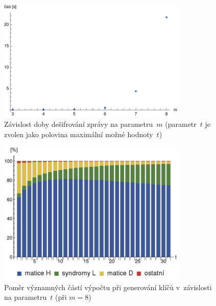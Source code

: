 \documentclass[thesis=M,czech,hidelinks]{FITthesis}[2012/06/26]
\newcommand{\0}{{\textcolor[gray]{0.75}{0}}}
\begin{document}
\begin{figure}[!ht]
    \centering
    \includegraphics[width=0.8\textwidth]{../implementace/grafy/listplot_tPul_desifrovani.pdf}
    \caption{
        Závislost doby dešifrování zprávy na parametru~$m$ (parametr~$t$ je
        zvolen jako polovina maximální možné hodnoty~$t$)
    }
    \label{obr_mereni_m_desifr}
\end{figure}

\begin{figure}[!ht]
    \centering
    \includegraphics[width=0.8\textwidth]{../implementace/grafy/chart_m8_generovani.png}
    \caption{
        Poměr významných částí výpočtu při generování klíčů v~závislosti na
        parametru~$t$ (při $m=8$)
    }
    \label{obr_mereni_pomer_gen}
\end{figure}
\end{document}
